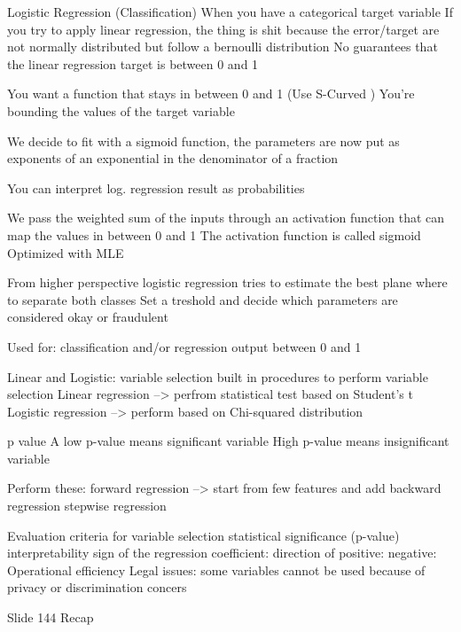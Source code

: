     Logistic Regression (Classification)
        When you have a categorical target variable 
        If you try to apply linear regression, the thing is shit because
        the error/target are not normally distributed but follow a bernoulli distribution
        No guarantees that the linear regression target is between 0 and 1

        You want a function that stays in between 0 and 1 (Use S-Curved )
        You're bounding the values of the target variable 

        We decide to fit with a sigmoid function, the parameters are now put as 
        exponents of an exponential in the denominator of a fraction 

        You can interpret log. regression result as probabilities 

        We pass the weighted sum of the inputs through an activation function that 
        can map the values in between 0 and 1 
        The activation function is called sigmoid 
        Optimized with MLE 

        From higher perspective logistic regression tries to estimate the best plane where to separate both classes 
        Set a treshold and decide which parameters are considered okay or fraudulent 

        Used for:
            classification and/or regression 
            output between 0 and 1 

    Linear and Logistic: variable selection 
        built in procedures to perform variable selection 
        Linear regression --> perfrom statistical test based on Student's t 
        Logistic regression --> perform based on Chi-squared distribution 

        p value 
        A low p-value means significant variable 
        High p-value means insignificant variable 

        Perform these:
            forward regression --> start from few features and add 
            backward regression 
            stepwise regression 

        Evaluation criteria for variable selection 
            statistical significance (p-value)
            interpretability
                sign of the regression coefficient: direction of 
                    positive: 
                    negative: 
            Operational efficiency 
            Legal issues: some variables cannot be used because of privacy or discrimination concers 

    Slide 144 Recap

